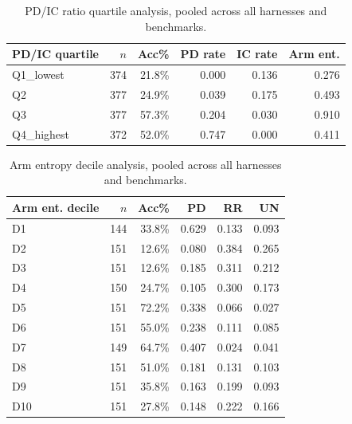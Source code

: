\begin{table}[t]
\centering\small
\caption{PD/IC ratio quartile analysis, pooled across all harnesses and benchmarks.}
\label{tab:arm-macro-pdic}
\begin{tabular}{lrrrrr}\toprule
PD/IC quartile & $n$ & Acc\% & PD rate & IC rate & Arm ent. \\ \midrule
  Q1_lowest & 374 & 21.8\% & 0.000 & 0.136 & 0.276 \\
  Q2 & 377 & 24.9\% & 0.039 & 0.175 & 0.493 \\
  Q3 & 377 & 57.3\% & 0.204 & 0.030 & 0.910 \\
  Q4_highest & 372 & 52.0\% & 0.747 & 0.000 & 0.411 \\
\bottomrule\end{tabular}\end{table}
\begin{table}[t]
\centering\small
\caption{Arm entropy decile analysis, pooled across all harnesses and benchmarks.}
\label{tab:arm-macro-arment}
\begin{tabular}{lrrrrr}\toprule
Arm ent. decile & $n$ & Acc\% & PD & RR & UN \\ \midrule
  D1 & 144 & 33.8\% & 0.629 & 0.133 & 0.093 \\
  D2 & 151 & 12.6\% & 0.080 & 0.384 & 0.265 \\
  D3 & 151 & 12.6\% & 0.185 & 0.311 & 0.212 \\
  D4 & 150 & 24.7\% & 0.105 & 0.300 & 0.173 \\
  D5 & 151 & 72.2\% & 0.338 & 0.066 & 0.027 \\
  D6 & 151 & 55.0\% & 0.238 & 0.111 & 0.085 \\
  D7 & 149 & 64.7\% & 0.407 & 0.024 & 0.041 \\
  D8 & 151 & 51.0\% & 0.181 & 0.131 & 0.103 \\
  D9 & 151 & 35.8\% & 0.163 & 0.199 & 0.093 \\
  D10 & 151 & 27.8\% & 0.148 & 0.222 & 0.166 \\
\bottomrule\end{tabular}\end{table}
